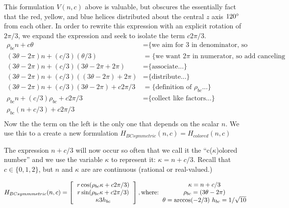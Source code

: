 \documentclass[11pt]{article}
\begin{document}
This formulation $V(n,c)$ above is valuable, but obscures the essentially fact that the red, yellow, and blue helices distributed
about the central $z$ axis $120\degree$ from each other.
In order to rewrite this expression with an explicit rotation of $2\pi/3$, we expand 
the expression and seek to isolate the term $c2\pi/3$.
\begin{align*}
  \rho_{bc} n + c \theta  &=   \text{\{we aim for 3 in denominator, so we split...\}} \\
    (3 \theta - 2 \pi)n + (c/3)  (\theta /3)  &=   \text{\{we want $2\pi$ in numerator, so add canceling terms...\}} \\
  (3 \theta - 2 \pi)n + (c/ 3) (3 \theta - 2 \pi  + 2 \pi) &=  \text{\{associate...\}} \\
  (3 \theta - 2 \pi)n + (c/ 3) ((3 \theta - 2 \pi)  + 2 \pi) &=  \text{\{distribute...\}} \\  
  (3 \theta - 2 \pi)n + (c / 3) (3 \theta - 2 \pi)  + c 2 \pi /3 &=  \text{\{definition of $\rho_{bc}$...\}} \\
  \rho_{bc} n + (c / 3) \rho_{bc}  + c 2 \pi /3 &=  \text{\{collect like factors...\}} \\  
  \rho_{bc} (n + c/3)  + c 2 \pi /3  \\
\end{align*}
Now the the term on the left is the only one that depends on the scalar $n$. We use this to a create
a new formulation $H_{BCsymmetric}(n,c) = H_{colored}(n,c)$

The expression $n+c/3$ will now occur so often that we call it the ``c($\kappa$)olored number'' and we use the variable $\kappa$ to represent it: $\kappa = n+c/3$.
Recall that $c \in \{0,1,2\}$, but $n$ and $\kappa$ are are continuous (rational or real-valued.)

\[
H_{BCsymmmetric}(n,c) =
\left [
  \begin{tabular}{c}
   $ r  \cos(\rho_{bc} \kappa  + c 2 \pi /3) $\\
   $ r  \sin(\rho_{bc} \kappa  + c 2 \pi /3) $\\
   $ \kappa 3  h_{bc} $
  \end{tabular}
  \right ],
\text{where:}
  \begin{tabular}{c}
 $\kappa = n + c/3$ \\
    $\rho_{bc} = (3 \theta - 2 \pi)$ \\
    $ \theta = \arccos(-2/3) $
    $ h_{bc} = 1/\sqrt{10} $ \\    
  \end{tabular}      
\]
\end{document}
